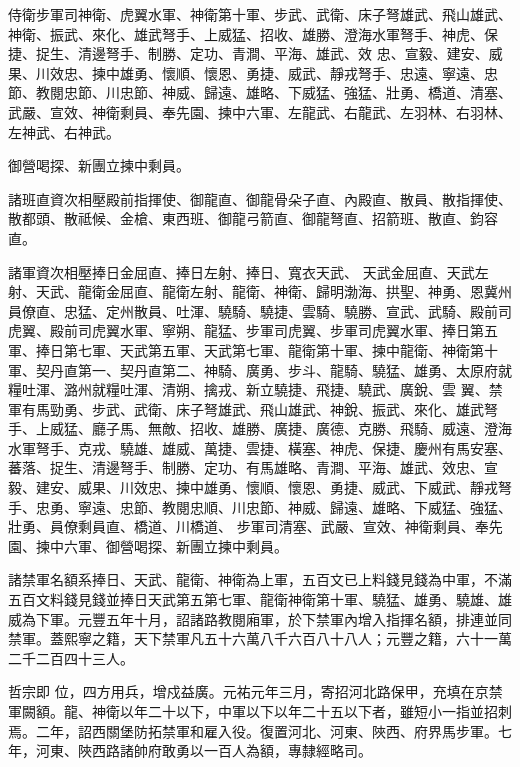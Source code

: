 \begin{pinyinscope}
 侍衛步軍司神衛、虎翼水軍、神衛第十軍、步武、武衛、床子弩雄武、飛山雄武、神衛、振武、來化、雄武弩手、上威猛、招收、雄勝、澄海水軍弩手、神虎、保捷、捉生、清邊弩手、制勝、定功、青澗、平海、雄武、效
 忠、宣毅、建安、威果、川效忠、揀中雄勇、懷順、懷恩、勇捷、威武、靜戎弩手、忠遠、寧遠、忠節、教閱忠節、川忠節、神威、歸遠、雄略、下威猛、強猛、壯勇、橋道、清塞、武嚴、宣效、神衛剩員、奉先園、揀中六軍、左龍武、右龍武、左羽林、右羽林、左神武、右神武。



 御營喝探、新團立揀中剩員。



 諸班直資次相壓殿前指揮使、御龍直、御龍骨朵子直、內殿直、散員、散指揮使、散都頭、散祗候、金槍、東西班、御龍弓箭直、御龍弩直、招箭班、散直、鈞容直。



 諸軍資次相壓捧日金屈直、捧日左射、捧日、寬衣天武、
 天武金屈直、天武左射、天武、龍衛金屈直、龍衛左射、龍衛、神衛、歸明渤海、拱聖、神勇、恩冀州員僚直、忠猛、定州散員、吐渾、驍騎、驍捷、雲騎、驍勝、宣武、武騎、殿前司虎翼、殿前司虎翼水軍、寧朔、龍猛、步軍司虎翼、步軍司虎翼水軍、捧日第五軍、捧日第七軍、天武第五軍、天武第七軍、龍衛第十軍、揀中龍衛、神衛第十軍、契丹直第一、契丹直第二、神騎、廣勇、步斗、龍騎、驍猛、雄勇、太原府就糧吐渾、潞州就糧吐渾、清朔、擒戎、新立驍捷、飛捷、驍武、廣銳、雲
 翼、禁軍有馬勁勇、步武、武衛、床子弩雄武、飛山雄武、神銳、振武、來化、雄武弩手、上威猛、廳子馬、無敵、招收、雄勝、廣捷、廣德、克勝、飛騎、威遠、澄海水軍弩手、克戎、驍雄、雄威、萬捷、雲捷、橫塞、神虎、保捷、慶州有馬安塞、蕃落、捉生、清邊弩手、制勝、定功、有馬雄略、青澗、平海、雄武、效忠、宣毅、建安、威果、川效忠、揀中雄勇、懷順、懷恩、勇捷、威武、下威武、靜戎弩手、忠勇、寧遠、忠節、教閱忠順、川忠節、神威、歸遠、雄略、下威猛、強猛、壯勇、員僚剩員直、橋道、川橋道、
 步軍司清塞、武嚴、宣效、神衛剩員、奉先園、揀中六軍、御營喝探、新團立揀中剩員。



 諸禁軍名額系捧日、天武、龍衛、神衛為上軍，五百文已上料錢見錢為中軍，不滿五百文料錢見錢並捧日天武第五第七軍、龍衛神衛第十軍、驍猛、雄勇、驍雄、雄威為下軍。元豐五年十月，詔諸路教閱廂軍，於下禁軍內增入指揮名額，排連並同禁軍。蓋熙寧之籍，天下禁軍凡五十六萬八千六百八十八人；元豐之籍，六十一萬二千二百四十三人。



 哲宗即
 位，四方用兵，增戍益廣。元祐元年三月，寄招河北路保甲，充填在京禁軍闕額。龍、神衛以年二十以下，中軍以下以年二十五以下者，雖短小一指並招刺焉。二年，詔西關堡防拓禁軍和雇入役。復置河北、河東、陜西、府界馬步軍。七年，河東、陜西路諸帥府敢勇以一百人為額，專隸經略司。




\end{pinyinscope}
